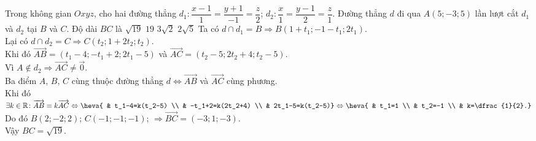 \begin{ex}%
	Trong không gian $Oxyz$, cho hai đường thẳng $d_1\colon \dfrac{x-1}{1}=\dfrac{y+1}{-1}=\dfrac{z}{2}$; $d_2\colon \dfrac{x}{1}=\dfrac{y-1}{2}=\dfrac{z}{1}$. Đường thẳng $d$ đi qua $A(5;-3;5)$ lần lượt cắt $d_1$ và $d_2$ tại $B$ và $C$. Độ dài $BC$ là
	\choice
	{\True $\sqrt{19}$}
	{$19$}
	{$3\sqrt{2}$}
	{$2\sqrt{5}$}
	\loigiai
	{
		Ta có $d\cap d_1=B \Rightarrow B(1+t_1;-1-t_1;2t_1)$.\\
		Lại có $d\cap d_2=C \Rightarrow C(t_2;1+2t_2;t_2)$.\\
		Khi đó $\overrightarrow{AB}=(t_1-4;-t_1+2;2t_1-5)$ và $\overrightarrow{AC}=(t_2-5;2t_2+4;t_2-5)$.\\
		Vì $A\notin d_2 \Rightarrow \overrightarrow{AC}\ne\overrightarrow{0}$.\\
		Ba điểm $A$, $B$, $C$ cùng thuộc đường thẳng $d \Leftrightarrow \overrightarrow{AB}$ và $\overrightarrow{AC}$ cùng phương.\\
		Khi đó $\exists k \in \mathbb{R} \colon \overrightarrow{AB}=k\overrightarrow{AC} \Leftrightarrow \heva{ & t_1-4=k(t_2-5) \\ & -t_1+2=k(2t_2+4) \\ & 2t_1-5=k(t_2-5)} \Leftrightarrow \heva{ & t_1=1 \\ & t_2=-1 \\ & k=\dfrac{1}{2}.}$\\
		Do đó $B(2;-2;2)$; $C(-1;-1;-1)$; $\Rightarrow \overrightarrow{BC}=(-3;1;-3)$.\\
		Vậy $BC=\sqrt{19}$.
	}
\end{ex}
